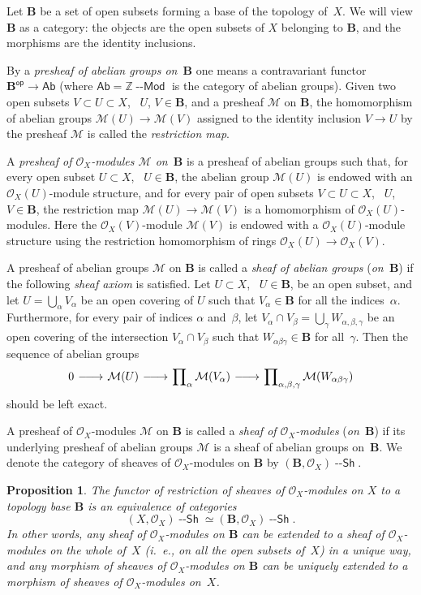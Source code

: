 \documentclass[12pt,a4paper]{amsart}
\newcommand{\+}{\nobreakdash-}
\renewcommand{\:}{\colon}
\newcommand{\rarrow}{\longrightarrow}
\newcommand{\lrarrow}{\mskip.5\thinmuskip\relbar\joinrel\relbar
   \joinrel\rightarrow\mskip.5\thinmuskip\relax}
\newcommand{\Modl}{{\operatorname{\mathsf{--Mod}}}}
\newcommand{\Sh}{{\operatorname{\mathsf{--Sh}}}}
\newcommand{\Ab}{\mathsf{Ab}}
\newcommand{\sop}{\mathsf{op}}
\newcommand{\bB}{\mathbf B}
\newcommand{\cO}{\mathcal O}
\newcommand{\cM}{\mathcal M}
\newcommand{\boZ}{\mathbb Z}
\theoremstyle{plain}
\newtheorem{prop}[thm]{Proposition}
\theoremstyle{definition}
\begin{document}
 Let $\bB$ be a set of open subsets forming a base of the topology
of~$X$.
 We will view $\bB$ as a category: the objects are the open subsets
of $X$ belonging to $\bB$, and the morphisms are the identity
inclusions.

 By a \emph{presheaf of abelian groups on\/~$\bB$} one means
a contravariant functor $\bB^\sop\rarrow\Ab$ (where $\Ab=\boZ\Modl$
is the category of abelian groups).
 Given two open subsets $V\subset U\subset X$, \ $U$, $V\in\bB$,
and a presheaf $\cM$ on $\bB$, the homomorphism of abelian groups
$\cM(U)\rarrow\cM(V)$ assigned to the identity inclusion $V\rarrow U$
by the presheaf $\cM$ is called the \emph{restriction map}.

 A \emph{presheaf of\/ $\cO_X$\+modules $\cM$ on\/~$\bB$} is a presheaf
of abelian groups such that, for every open subset $U\subset X$,
\ $U\in\bB$, the abelian group $\cM(U)$ is endowed with
an $\cO_X(U)$\+module structure, and for every pair of open subsets
$V\subset U\subset X$, \ $U$, $V\in\bB$, the restriction map
$\cM(U)\rarrow\cM(V)$ is a homomorphism of $\cO_X(U)$\+modules.
 Here the $\cO_X(V)$\+module $\cM(V)$ is endowed with
a $\cO_X(U)$\+module structure using the restriction homomorphism
of rings $\cO_X(U)\rarrow\cO_X(V)$.

 A presheaf of abelian groups $\cM$ on $\bB$ is called a \emph{sheaf
of abelian groups} (\emph{on\/~$\bB$}) if the following \emph{sheaf
axiom} is satisfied.
 Let $U\subset X$, \ $U\in\bB$, be an open subset, and let
$U=\bigcup_\alpha V_\alpha$ be an open covering of $U$ such that
$V_\alpha\in\bB$ for all the indices~$\alpha$.
 Furthermore, for every pair of indices $\alpha$ and~$\beta$, let
$V_\alpha\cap V_\beta=\bigcup_\gamma W_{\alpha,\beta,\gamma}$ be
an open covering of the intersection $V_\alpha\cap V_\beta$
such that $W_{\alpha\beta\gamma}\in\bB$ for all~$\gamma$.
 Then the sequence of abelian groups
\begin{equation} \label{sheaf-axiom-for-topology-base}
 0\lrarrow \cM(U)\lrarrow\prod\nolimits_\alpha\cM(V_\alpha)
 \lrarrow\prod\nolimits_{\alpha,\beta,\gamma}\cM(W_{\alpha\beta\gamma})
\end{equation}
should be left exact.

 A presheaf of $\cO_X$\+modules $\cM$ on $\bB$ is called a \emph{sheaf
of\/ $\cO_X$\+modules} (\emph{on\/~$\bB$}) if its underlying presheaf
of abelian groups $\cM$ is a sheaf of abelian groups on~$\bB$.
 We denote the category of sheaves of $\cO_X$\+modules on $\bB$ by
$(\bB,\cO_X)\Sh$.

\begin{prop} \label{sheaves-determined-on-topology-base}
 The functor of restriction of sheaves of\/ $\cO_X$\+modules on $X$
to a topology base\/ $\bB$ is an equivalence of categories
$$
 (X,\cO_X)\Sh\simeq(\bB,\cO_X)\Sh.
$$
 In other words, any sheaf of\/ $\cO_X$\+modules on\/ $\bB$ can be
extended to a sheaf of\/ $\cO_X$\+modules on the whole of~$X$ (i.~e.,
on all the open subsets of~$X$) in a unique way, and any morphism
of sheaves of\/ $\cO_X$\+modules on\/ $\bB$ can be uniquely extended
to a morphism of sheaves of\/ $\cO_X$\+modules on~$X$.
\end{prop}
\end{document}
